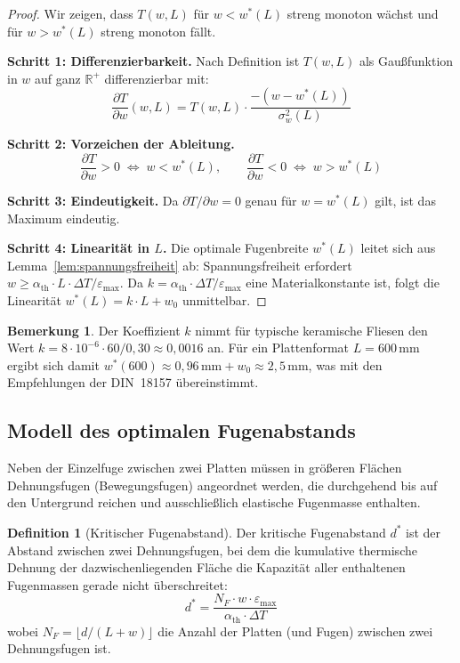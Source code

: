﻿\documentclass[a4paper,12pt]{article}
\theoremstyle{definition}
\newtheorem{definition}{Definition}
\newtheorem{bemerkung}{Bemerkung}
\begin{document}
\begin{proof}
	Wir zeigen, dass $T(w, L)$ für $w < w^*(L)$ streng monoton wächst
	und für $w > w^*(L)$ streng monoton fällt.

	\textbf{Schritt 1: Differenzierbarkeit.}
	Nach Definition ist $T(w, L)$ als Gaußfunktion in $w$ auf ganz
	$\mathbb{R}^+$ differenzierbar mit:
	\[
	\frac{\partial T}{\partial w}(w, L) = T(w, L) \cdot \frac{-(w - w^*(L))}{\sigma_w^2(L)}
	\]

	\textbf{Schritt 2: Vorzeichen der Ableitung.}
	\[
	\frac{\partial T}{\partial w} > 0 \;\Longleftrightarrow\; w < w^*(L), \qquad
	\frac{\partial T}{\partial w} < 0 \;\Longleftrightarrow\; w > w^*(L)
	\]

	\textbf{Schritt 3: Eindeutigkeit.}
	Da $\partial T/\partial w = 0$ genau für $w = w^*(L)$ gilt, ist das
	Maximum eindeutig.

	\textbf{Schritt 4: Linearität in $L$.}
	Die optimale Fugenbreite $w^*(L)$ leitet sich aus Lemma~\ref{lem:spannungsfreiheit}
	ab: Spannungsfreiheit erfordert $w \geq \alpha_{\text{th}} \cdot L \cdot \Delta T / \varepsilon_{\max}$.
	Da $k = \alpha_{\text{th}} \cdot \Delta T / \varepsilon_{\max}$ eine
	Materialkonstante ist, folgt die Linearität $w^*(L) = k \cdot L + w_0$
	unmittelbar.
\end{proof}

\begin{bemerkung}
	Der Koeffizient $k$ nimmt für typische keramische Fliesen den Wert
	$k = 8 \cdot 10^{-6} \cdot 60 / 0{,}30 \approx 0{,}0016$ an.
	Für ein Plattenformat $L = 600\,\text{mm}$ ergibt sich damit
	$w^*(600) \approx 0{,}96\,\text{mm} + w_0 \approx 2{,}5\,\text{mm}$,
	was mit den Empfehlungen der DIN~18157 übereinstimmt.
\end{bemerkung}

\subsection{Modell des optimalen Fugenabstands}

Neben der Einzelfuge zwischen zwei Platten müssen in größeren Flächen
Dehnungsfugen (Bewegungsfugen) angeordnet werden, die durchgehend bis
auf den Untergrund reichen und ausschließlich elastische Fugenmasse
enthalten.

\begin{definition}[Kritischer Fugenabstand]
	Der kritische Fugenabstand $d^*$ ist der Abstand zwischen zwei
	Dehnungsfugen, bei dem die kumulative thermische Dehnung der
	dazwischenliegenden Fläche die Kapazität aller enthaltenen
	Fugenmassen gerade nicht überschreitet:
	\[
	d^* = \frac{N_F \cdot w \cdot \varepsilon_{\max}}{\alpha_{\text{th}} \cdot \Delta T}
	\]
	wobei $N_F = \lfloor d / (L + w) \rfloor$ die Anzahl der Platten
	(und Fugen) zwischen zwei Dehnungsfugen ist.
\end{definition}
\end{document}
